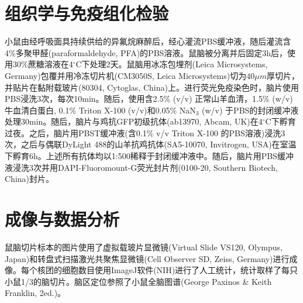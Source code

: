\section{组织学与免疫组化检验}
小鼠由经呼吸面具持续供给的异氟烷麻醉后，经心灌流PBS缓冲液，随后灌流含4\%多聚甲醛(paraformaldehyde, PFA)的PBS溶液。鼠脑被分离并后固定3h后，使用30\%蔗糖溶液在4$^\circ$C下处理2天。鼠脑用冰冻包埋剂(Leica Microsystems, Germany)包覆并用冷冻切片机(CM3050S, Leica Microsystems)切为$40\mu m$厚切片，并贴片在黏附载玻片(80304, Cytoglas, China)上。进行荧光免疫染色时，脑片使用PBS浸洗3次，每次10min。随后，使用含2.5\% (v/v) 正常山羊血清，1.5\% (w/v) 牛血清白蛋白, 0.1\% Triton\texttrademark{} X-100 (v/v)和0.05\% NaN$_3$ (w/v) 于PBS的封闭缓冲液处理30min。随后，脑片与鸡抗GFP初级抗体(ab13970, Abcam, UK)在4$^\circ$C下孵育过夜。之后，脑片用PBST缓冲液(含0.1\% v/v Triton\texttrademark{} X-100 的PBS溶液)浸洗3次，之后与偶联DyLight 488的山羊抗鸡抗体(SA5-10070, Invitrogen, USA)在室温下孵育6h。上述所有抗体均以1:500稀释于封闭缓冲液中。随后，脑片用PBS缓冲液浸洗3次并用DAPI-Fluoromount-G荧光封片剂(0100-20, Southern Biotech, China)封片。

\section{成像与数据分析}
鼠脑切片标本的图片使用了虚拟载玻片显微镜(Virtual Slide VS120, Olympus, Japan)和转盘式扫描激光共聚焦显微镜(Cell Observer SD, Zeiss, Germany)进行成像。每个核团的细胞数目使用ImageJ软件(NIH)进行了人工统计，统计取样了每只小鼠1/3的脑切片。脑区定位参照了小鼠全脑图谱(George Paxinos \& Keith Franklin, 2ed.)。